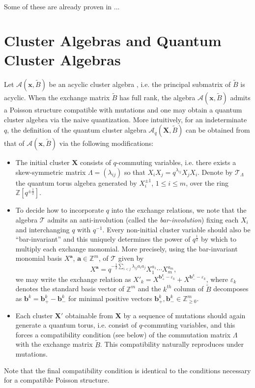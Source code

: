 \documentclass{amsart}
\newcommand{\bfa}{\mathbf{a}}
\newcommand{\bfb}{\mathbf{b}}
\newcommand{\bfx}{\mathbf{x}}
\newcommand{\bfX}{\mathbf{X}}
\newcommand{\cA}{\mathcal{A}}
\newcommand{\cT}{\mathcal{T}}
\newcommand{\half}{{\frac{1}{2}}}
\newcommand{\ZZ}{\mathbb{Z}}
\begin{document}
  Some of these are already proven in \cite{demonet}...

  \section{Cluster  Algebras and Quantum Cluster Algebras} Let $\cA(\bfx,\tilde B)$ be an acyclic cluster algebra \cite{berenstein-fomin-zelevinsky}, i.e. the principal submatrix of $\tilde B$ is acyclic.  
  When the exchange matrix $\tilde B$ has full rank, the algebra $\cA(\bfx,\tilde B)$ admits a Poisson structure compatible with mutations \cite{gekhtman-shapiro-vainshtein} and one may obtain a quantum cluster algebra via the naive quantization.  
  More intuitively, for an indeterminate $q$, the definition of the quantum cluster algebra $\cA_q(\bfX,\tilde B)$ can be obtained from that of $\cA(\bfx,\tilde B)$ via the following modifications:
  \begin{itemize}
    \item The initial cluster $\bfX$ consists of $q$-commuting variables, i.e. there exists a skew-symmetric matrix $\Lambda=(\lambda_{ij})$ so that $X_iX_j=q^{\lambda_{ij}}X_jX_i$.  
    Denote by $\cT_\Lambda$ the quantum torus algebra generated by $X_i^{\pm1}$, $1\le i\le m$, over the ring $\ZZ[q^{\pm\half}]$.
    \item To decide how to incorporate $q$ into the exchange relations, we note that the algebra $\cT$ admits an anti-involution (called the \emph{bar-involution}) fixing each $X_i$ and interchanging $q$ with $q^{-1}$.
    Every non-initial cluster variable should also be ``bar-invariant'' and this uniquely determines the power of $q^\half$ by which to multiply each exchange monomial.  
    More precisely, using the bar-invariant monomial basis $X^\bfa$, $\bfa\in\ZZ^m$, of $\cT$ given by
    \[X^\bfa=q^{-\half\sum\limits_{i<j}\lambda_{ij}a_ia_j}X_1^{a_1}\cdots X_m^{a_m},\]
    we may write the exchange relation as $X'_k=X^{\bfb_+^k-\varepsilon_k}+X^{\bfb_-^k-\varepsilon_k}$, where $\varepsilon_k$ denotes the standard basis vector of $\ZZ^m$ and the $k^{th}$ column of $\tilde B$ decomposes as $\bfb^k=\bfb^k_+-\bfb^k_-$ for minimal positive vectors $\bfb^k_+,\bfb^k_-\in\ZZ_{\ge0}^m$.
    \item Each cluster $\bfX'$ obtainable from $\bfX$ by a sequence of mutations should again generate a quantum torus, i.e. consist of $q$-commuting variables, and this forces a compatibility condition (see below) of the commutation matrix $\Lambda$ with the exchange matrix $\tilde B$.
    This compatibility naturally reproduces under mutations.
  \end{itemize}
  Note that the final compatibility condition is identical to the conditions necessary for a compatible Poisson structure.
  
\end{document}
